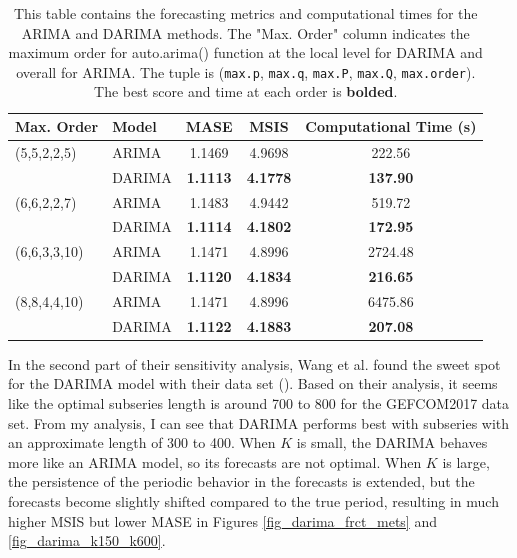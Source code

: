 \documentclass[
]{article}
\begin{document}
\begin{table}
  \begin{center}
    \begin{tabular}[b]{l| l c c c}
      \hline
      Max. Order & Model & MASE & MSIS & Computational Time (s) \\
      \hline
      (5,5,2,2,5) & ARIMA & 1.1469 & 4.9698 & 222.56 \\
       & DARIMA & \textbf{1.1113} & \textbf{4.1778} & \textbf{137.90} \\
      (6,6,2,2,7) & ARIMA & 1.1483 & 4.9442 & 519.72 \\
       & DARIMA & \textbf{1.1114} & \textbf{4.1802} & \textbf{172.95} \\
      (6,6,3,3,10) & ARIMA & 1.1471 & 4.8996 & 2724.48 \\
       & DARIMA & \textbf{1.1120} & \textbf{4.1834} & \textbf{216.65} \\
      (8,8,4,4,10) & ARIMA & 1.1471 & 4.8996 & 6475.86 \\
       & DARIMA & \textbf{1.1122} & \textbf{4.1883} & \textbf{207.08} \\
      \hline
    \end{tabular}
    \caption{This table contains the forecasting metrics and computational times for the ARIMA and DARIMA methods. The "Max. Order" column indicates the maximum order for auto.arima() function at the local level for DARIMA and overall for ARIMA. The tuple is (\texttt{max.p}, \texttt{max.q}, \texttt{max.P}, \texttt{max.Q}, \texttt{max.order}). The best score and time at each order is \textbf{bolded}.}
    \label{tab-max-order}
  \end{center}
\end{table}

In the second part of their sensitivity analysis, Wang et al. found the sweet spot for the DARIMA model with their data set (\cite*[p.~30]{wang_distributed_2020}). Based on their analysis, it seems like the optimal subseries length is around 700 to 800 for the GEFCOM2017 data set. From my analysis, I can see that DARIMA performs best with subseries with an approximate length of 300 to 400. When $K$ is small, the DARIMA behaves more like an ARIMA model, so its forecasts are not optimal. When $K$ is large, the persistence of the periodic behavior in the forecasts is extended, but the forecasts become slightly shifted compared to the true period, resulting in much higher MSIS but lower MASE in Figures \ref{fig_darima_frct_mets} and \ref{fig_darima_k150_k600}.
\end{document}
